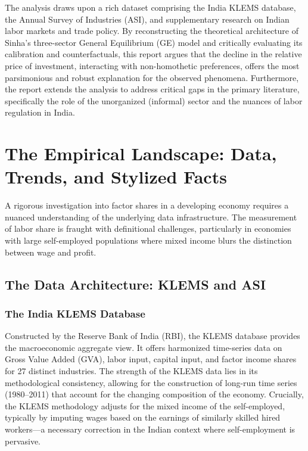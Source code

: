\documentclass[12pt]{article}
\begin{document}
The analysis draws upon a rich dataset comprising the India KLEMS database, the Annual Survey of Industries (ASI), and supplementary research on Indian labor markets and trade policy. By reconstructing the theoretical architecture of Sinha's three-sector General Equilibrium (GE) model and critically evaluating its calibration and counterfactuals, this report argues that the decline in the relative price of investment, interacting with non-homothetic preferences, offers the most parsimonious and robust explanation for the observed phenomena. Furthermore, the report extends the analysis to address critical gaps in the primary literature, specifically the role of the unorganized (informal) sector and the nuances of labor regulation in India.

\newpage
\section{The Empirical Landscape: Data, Trends, and Stylized Facts}

A rigorous investigation into factor shares in a developing economy requires a nuanced understanding of the underlying data infrastructure. The measurement of labor share is fraught with definitional challenges, particularly in economies with large self-employed populations where mixed income blurs the distinction between wage and profit.

\subsection{The Data Architecture: KLEMS and ASI}

\subsubsection{The India KLEMS Database}
Constructed by the Reserve Bank of India (RBI), the KLEMS database provides the macroeconomic aggregate view. It offers harmonized time-series data on Gross Value Added (GVA), labor input, capital input, and factor income shares for 27 distinct industries. The strength of the KLEMS data lies in its methodological consistency, allowing for the construction of long-run time series (1980–2011) that account for the changing composition of the economy. Crucially, the KLEMS methodology adjusts for the mixed income of the self-employed, typically by imputing wages based on the earnings of similarly skilled hired workers—a necessary correction in the Indian context where self-employment is pervasive.
\end{document}
